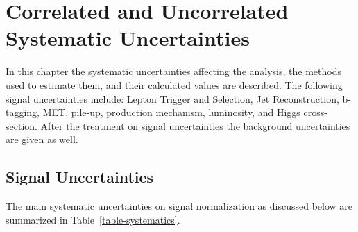 

\chapter{Correlated and Uncorrelated Systematic Uncertainties}
\label{sec:systematics}


In this chapter the systematic uncertainties affecting the analysis, the methods used to estimate them, and their calculated values are described. The following signal uncertainties include: Lepton Trigger and Selection, Jet Reconstruction, b-tagging, MET, pile-up, production mechanism, luminosity, and Higgs cross-section.  After the treatment on signal uncertainties the background uncertainties are given as well.




\section{Signal Uncertainties}
The main systematic uncertainties on signal normalization as discussed below are summarized in Table~\ref{table-systematics}.

